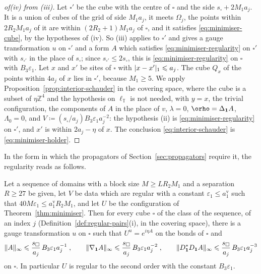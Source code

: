 \documentclass[11pt]{preprint}
\let\rho\orho
\newcommand{\id}{\mathbf 1}
\DeclarePairedDelimiter{\abs}{\lvert}{\rvert}
\DeclarePairedDelimiter{\norm}{\lVert}{\rVert}
\numberwithin{equation}{section}
\begin{document}
\begin{proof}[of\emph{(iv)} from \emph{(iii)}]
Let $\square'$ be the cube with the centre of $\square$ and the side $s_\square + 2M_1a_j$. It is a union of cubes of the grid of side $M_1a_j$, it meets $\Omega_j$, the points within $2R_2M_1a_j$ of it are within $(2R_2 + 1)M_1a_j$ of $\square$, and it satisfies \eqref{eq:minimiser-cube}, by the hypotheses of (iv). So (iii) applies to $\square'$ and gives a gauge transformation $u$ on $\square'$ and a form $A$ which satisfies \eqref{eq:minimiser-regularity} on $\square'$ with $s_{\square'}$ in the place of $s_\square$; since $s_{\square'} \leqslant 2s_\square$, this is \eqref{eq:minimiser-regularity} on $\square$ with $B_3\varepsilon_1$. Let $x$ and $x'$ be sites of $\square$ with $\abs{x - x'}_1 \leqslant a_j$. The cube $Q_x$ of the points within $4a_j$ of $x$ lies in $\square'$, because $M_1 \geqslant 5$. We apply Proposition~\ref{prop:interior-schauder} in the covering space, where the cube is a subset of $\eta\mathbb Z^4$ and the hypothesis on $\ell_{\mathbb T}$ is not needed, with $y = x$, the trivial configuration, the components of $A$ in the place of $v$, $\lambda = 0$, $\rho = \Delta_{\id}A$, $\Lambda_0 = 0$, and $V \coloneqq (s_\square/a_j)B_3\varepsilon_1a_j^{-2}$: the hypothesis (ii) is \eqref{eq:minimiser-regularity} on $\square'$, and $x'$ is within $2a_j - \eta$ of $x$. The conclusion \eqref{eq:interior-schauder} is \eqref{eq:minimiser-holder}.
\end{proof}

In the form in which the propagators of Section~\ref{sec:propagators} require it, the regularity reads as follows.

\begin{corollary}\label{cor:minimiser-regular}
Let a sequence of domains with a block size $M \geqslant LR_2M_1$ and a separation $R \geqslant 27$ be given, let $V$ be data which are regular with a constant $\varepsilon_1 \leqslant a^{\mathrm v}_1$ such that $40M\varepsilon_1 \leqslant a^{\mathrm v}_1R_2M_1$, and let $U$ be the configuration of Theorem~\ref{thm:minimiser}. Then for every cube $\square$ of the class of the sequence, of an index $j$ (Definition~\ref{def:regular-pairs}(i), in the covering space), there is a gauge transformation $u$ on $\square$ such that $U^u = e^{i\eta A}$ on the bonds of $\square$ and
\begin{equation}\label{eq:minimiser-regular}
    \norm A_\infty\leqslant \frac{s_\square}{a_j}\,B_3\varepsilon_1a_j^{-1}\;,
    \qquad
    \norm{\nabla_{\id}A}_\infty \leqslant \frac{s_\square}{a_j}\,B_3\varepsilon_1a_j^{-2}\;,
    \qquad
    \norm{D^*_{\id}D_{\id}A}_\infty \leqslant \frac{s_\square}{a_j}\,B_3\varepsilon_1a_j^{-3}
\end{equation}
on $\square$. In particular $U$ is regular to the second order with the constant $B_3\varepsilon_1$.
\end{corollary}
\end{document}

